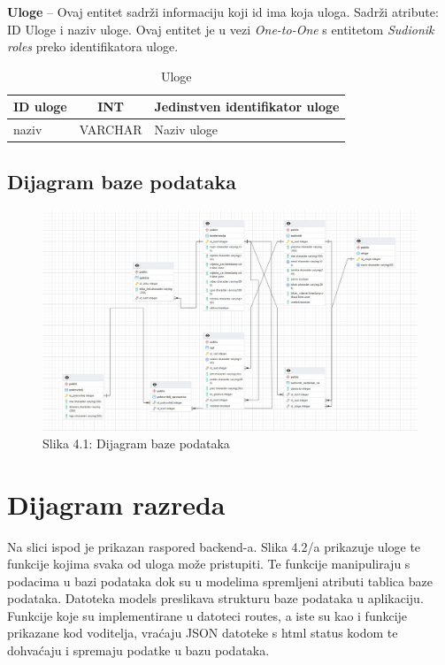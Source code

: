 \textbf{Uloge} – Ovaj entitet sadrži informaciju koji id ima koja uloga. Sadrži atribute: ID Uloge i naziv uloge. Ovaj entitet je u vezi \textit{One-to-One} s entitetom \textit{Sudionik roles} preko identifikatora uloge.

\begin{table}[H]
	\caption{Uloge}
	\label{tbl:uloge}
	\centering
	\begin{tabular}{|l|c|l|} 
		\hline
		\cellcolor{lightgreen}ID uloge & INT & Jedinstven identifikator uloge\\ 
		\hline
		naziv & VARCHAR & Naziv uloge\\ 
		\hline
	\end{tabular}
\end{table}		
			
\subsection{Dijagram baze podataka}

\begin{figure}[htb]
	\centering
	\includegraphics[width=15cm]{slike/dijagram.jpg}
	\caption{Slika 4.1: Dijagram baze podataka}
	\label{fig:fer-logo}
\end{figure}
			
			\eject
			
			
		\section{Dijagram razreda}
		
			\text{}Na slici ispod je prikazan raspored backend-a. Slika 4.2/a prikazuje uloge te funkcije kojima svaka od uloga može pristupiti. Te funkcije manipuliraju s podacima u bazi podataka dok su u modelima spremljeni atributi tablica baze podataka. Datoteka models preslikava strukturu baze podataka u aplikaciju. Funkcije koje su implementirane u datoteci routes, a iste su kao i funkcije prikazane kod voditelja, vraćaju JSON datoteke s html status kodom te dohvaćaju i spremaju podatke u bazu podataka.\\
			
